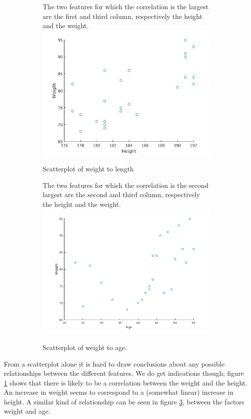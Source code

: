 \documentclass{article}
\begin{document}
\begin{figure}[H]
	\centering

	\begin{subfigure}[b]{.45\linewidth}
		The two features for which the correlation is the largest are the first and third column, respectively the height and the weight.
		\centering
		\includegraphics[width=\columnwidth]{plot_1_3_a.jpg}
		\caption{Scatterplot of weight to length}
		\label{fig1.3a}
	\end{subfigure}%
	\quad
	\begin{subfigure}[b]{.45\linewidth}
		The two features for which the correlation is the second largest are the second and third column, respectively the height and the weight.
		\centering
		\includegraphics[width=\linewidth]{plot_1_3_b.png}
		\caption{Scatterplot of weight to age.}
		\label{fig1.3b}
	\end{subfigure}
	\caption{}
\end{figure}
From a scatterplot alone it is hard to draw conclusions about any possible relationships between the different features. 
We do get indications though; figure \ref{fig1.3a} shows that there is likely to be a correlation between the weight and the height.
An increase in weight seems to correspond to a (somewhat linear) increase in height. 
A similar kind of relationship can be seen in figure \ref{fig1.3b}, between the factors weight and age.
\end{document}
